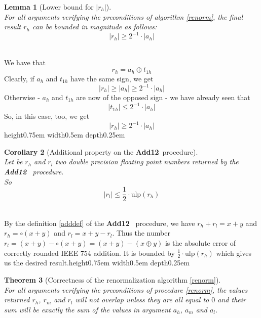 \documentclass[a4paper,10pt,twoside]{article}
\newtheorem{theorem}{Theorem}[section]
\newtheorem{lemma}[theorem]{Lemma}
\newtheorem{corollary}[theorem]{Corollary}
\newenvironment{proof}[1][Proof]{\begin{trivlist}
\item[\hskip \labelsep {\bfseries #1}]}{\end{trivlist}}
\newcommand{\qed}{\nobreak \ifvmode \relax \else \ifdim \lastskip<1.5em \hskip-\lastskip
\hskip1.5em plus0em minus0.5em \fi \nobreak \vrule height0.75em width0.5em depth0.25em\fi}
\newcommand{\hi}{\ensuremath{\mathit{h}}}
\newcommand{\mi}{\ensuremath{\mathit{m}}}
\newcommand{\lo}{\ensuremath{\mathit{l}}}
\newcommand{\Add}{{\bf Add12}}
\newcommand{\mUlp}{\ensuremath{\mathrm{ulp}}}
\begin{document}
\begin{lemma}[Lower bound for $\left \vert r_\hi \right \vert$] \label{minor}~\\
For all arguments verifying the preconditions of algorithm \ref{renorm}, 
the final result
$r_\hi$
can be bounded in magnitude as follows:
$$\left \vert r_\hi \right \vert \geq 2^{-1} \cdot \left \vert a_\hi \right \vert$$
\end{lemma}
\begin{proof} ~\\
We have that 
$$r_\hi = a_\hi \oplus t_{1\hi}$$
Clearly, if $a_\hi$ and $t_{1\hi}$ have the same sign, we get
$$\left \vert r_\hi \right \vert \geq \left \vert a_\hi \right \vert \geq 2^{-1} \cdot \left \vert a_\hi \right \vert$$
Otherwise - $a_\hi$ and $t_{1\hi}$ are now of the opposed sign - we have
already seen that 
$$\left \vert t_{1\hi} \right \vert \leq 2^{-1} \cdot \left \vert a_\hi \right \vert$$
So, in this case, too, we get
$$\left \vert r_\hi \right \vert \geq 2^{-1} \cdot \left \vert a_\hi \right \vert$$ \qed
\end{proof}
\begin{corollary}[Additional property on the \Add~procedure] \label{addsupp} ~\\
Let be $r_\hi$ and $r_\lo$ two double precision floating point numbers returned
by the \Add~ procedure. \\
So
$$\left \vert r_\lo \right \vert \leq \frac{1}{2} \cdot \mUlp\left( r_\hi \right)$$
\end{corollary}
\begin{proof} ~\\
By the definition \ref{adddef} of the \Add~ procedure, we have
$r_\hi + r_\lo = x + y$ and $r_\hi = \circ \left( x + y \right)$ and $r_\lo = x+y -r_\lo$.
Thus the number $r_\lo = \left( x + y \right) - \circ \left( x + y \right) = 
\left( x + y \right) - \left( x \oplus y \right)$ is the absolute error of correctly 
rounded IEEE 754 addition. It is bounded by $\frac{1}{2} \cdot \mUlp\left( r_\hi \right)$ which
gives us the desired result.\qed
\end{proof}
\begin{theorem}[Correctness of the renormalization algorithm \ref{renorm}] ~\\
For all arguments verifying the preconditions of procedure \ref{renorm}, 
the values returned 
$r_\hi$, $r_\mi$ and $r_\lo$ will not overlap 
unless they are all equal to $0$ and their sum will be exactly the sum of the
values in argument $a_\hi$, $a_\mi$ and $a_\lo$.
\end{theorem}
\end{document}
